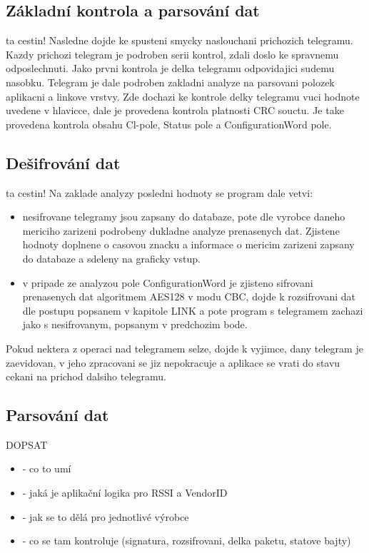 \subsection{Základní kontrola a parsování dat}
\colorbox[rgb]{1,0,0}{ta cestin!}
Nasledne dojde ke spusteni smycky naslouchani prichozich telegramu. Kazdy prichozi telegram je podroben serii kontrol, zdali doslo ke spravnemu odposlechnuti. Jako prvni kontrola je delka telegramu odpovidajici sudemu nasobku. Telegram je dale podroben zakladni analyze na parsovani polozek aplikacni a linkove vrstvy. Zde dochazi ke kontrole delky telegramu vuci hodnote uvedene v hlavicce, dale je provedena kontrola platnosti CRC souctu. Je take provedena kontrola obsahu Cl-pole, Status pole a ConfigurationWord pole.

\subsection{Dešifrování dat}
\colorbox[rgb]{1,0,0}{ta cestin!}
 Na zaklade analyzy posledni hodnoty se program dale vetvi:
\begin{itemize}
	\item nesifrovane telegramy jsou zapsany do databaze, pote dle vyrobce daneho mericiho zarizeni podrobeny dukladne analyze prenasenych dat. Zjistene hodnoty doplnene o casovou znacku a informace o mericim zarizeni zapsany do databaze a sdeleny na graficky vstup.
	\item v pripade ze analyzou pole ConfigurationWord je zjisteno sifrovani prenasenych dat algoritmem AES128 v modu CBC, dojde k rozsifrovani dat dle postupu popsanem v kapitole \colorbox[rgb]{1,0,0}{LINK} a pote program s telegramem zachazi jako s nesifrovanym, popsanym v predchozim bode.
\end{itemize}
Pokud nektera z operaci nad telegramem selze, dojde k vyjimce, dany telegram je zaevidovan, v jeho zpracovani se jiz nepokracuje a aplikace se vrati do stavu cekani na prichod dalsiho telegramu.

\subsection{Parsování dat}
\colorbox[rgb]{1,0,0}{DOPSAT}
\begin{itemize}
\item - co to umí
\item - jaká je aplikační logika pro RSSI a VendorID
\item - jak se to dělá pro jednotlivé výrobce
\item - co se tam kontroluje (signatura, rozsifrovani, delka paketu, statove bajty)
\end{itemize}

